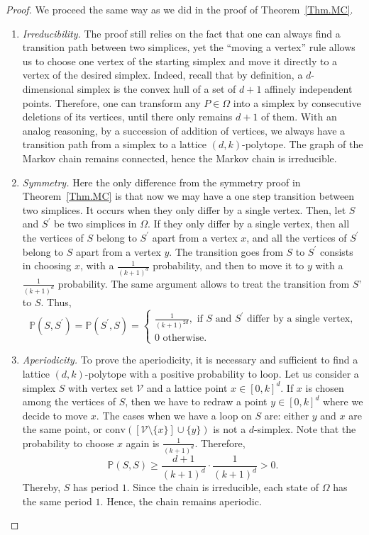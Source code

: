 \documentclass[a4paper,10pt]{article}
\begin{document}
\begin{proof}
  We proceed the same way as we did in the proof of Theorem~\ref{Thm.MC}.

  \begin{enumerate}[i]
    \item \textit{Irreducibility.}
    The proof still relies on the fact that one can always find a transition path between two simplices, yet the ``moving a vertex'' rule allows us to choose one vertex of the starting simplex and move it directly to a vertex of the desired simplex. Indeed, recall that by definition, a $d$-dimensional simplex is the convex hull of a set of $d+1$ affinely independent points. Therefore, one can transform any $P\in\Omega$ into a simplex by consecutive deletions of its vertices, until there only remains $d+1$ of them. With an analog reasoning, by a succession of addition of vertices, we always have a transition path from a simplex to a lattice $(d,k)$-polytope. The graph of the Markov chain remains connected, hence the Markov chain is irreducible.

    \item \textit{Symmetry.}
    Here the only difference from the symmetry proof in Theorem~\ref{Thm.MC} is that now we may have a one step transition between two simplices. It occurs when they only differ by a single vertex. Then, let $S$ and $S^\prime$ be two simplices in $\Omega$. If they only differ by a single vertex, then all the vertices of $S$ belong to $S^\prime$ apart from a vertex $x$, and all the vertices of $S^\prime$ belong to $S$ apart from a vertex $y$. The transition goes from $S$ to $S^\prime$ consists in choosing $x$, with a $\frac{1}{(k+1)^d}$ probability, and then to move it to $y$ with a $\frac{1}{(k+1)^d}$ probability. The same argument allows to treat the transition from $S’$ to $S$. Thus,
    $$
      \mathbb{P}(S,S^\prime)=\mathbb{P}(S^\prime,S)=
      \begin{cases}
        \displaystyle\frac{1}{(k+1)^{2d}} , \text{ if } S \text{ and } S^\prime \text{ differ by a single vertex,}\\
        0 \text{ otherwise.}
      \end{cases}
    $$

    \item \textit{Aperiodicity.}
    To prove the aperiodicity, it is necessary and sufficient to find a lattice $(d,k)$-polytope with a positive probability to loop. Let us consider a simplex $S$ with vertex set $\mathcal{V}$ and a lattice point $x \in [0,k]^d$. If $x$ is chosen among the vertices of $S$, then we have to redraw a point $y\in [0,k]^d$ where we decide to move $x$. The cases when we have a loop on $S$ are: either $y$ and $x$ are the same point, or $\mathrm{conv}([\mathcal{V}\mathord{\setminus}\{x\}]\cup\{y\})$ is not a $d$-simplex. Note that the probability to choose $x$ again is $\frac{1}{(k+1)^d}$.
    Therefore,
    $$
      \mathbb{P}(S,S)\geq{\frac{d+1}{(k+1)^d}\cdot\frac{1}{(k+1)^d}}>0.
    $$
    Thereby, $S$ has period $1$. Since the chain is irreducible, each state of $\Omega$ has the same period $1$. Hence, the chain remains aperiodic.
  \end{enumerate}
\end{proof}
\end{document}
